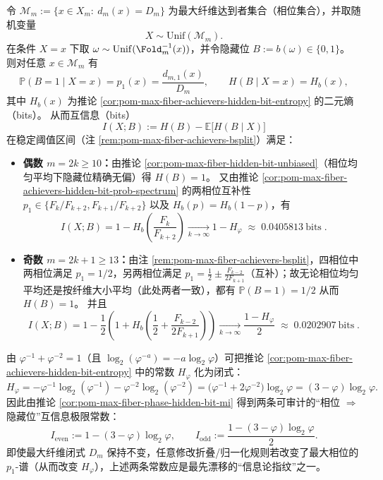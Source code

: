 \begin{corollary}\label{cor:pom-max-fiber-phase-hidden-bit-mi}
令 \(\mathcal{M}_m:=\{x\in X_m:\ d_m(x)=D_m\}\) 为最大纤维达到者集合（相位集合），并取随机变量
\[
X\sim\mathrm{Unif}(\mathcal{M}_m).
\]
在条件 \(X=x\) 下取
\(
\omega\sim\mathrm{Unif}(\Fold_m^{-1}(x))
\)，并令隐藏位 \(B:=b(\omega)\in\{0,1\}\)。
则对任意 \(x\in\mathcal{M}_m\) 有
\[
\mathbb{P}(B=1\mid X=x)=p_1(x)=\frac{d_{m,1}(x)}{D_m},
\qquad
H(B\mid X=x)=H_b(x),
\]
其中 \(H_b(x)\) 为推论 \ref{cor:pom-max-fiber-achievers-hidden-bit-entropy} 的二元熵（bits）。
从而互信息（bits）
\[
I(X;B):=H(B)-\mathbb{E}\!\bigl[H(B\mid X)\bigr]
\]
在稳定阈值区间（注 \ref{rem:pom-max-fiber-achievers-bsplit}）满足：
\begin{itemize}
  \item \textbf{偶数 \(m=2k\ge 10\)：}由推论 \ref{cor:pom-max-fiber-hidden-bit-unbiased}（相位均匀平均下隐藏位精确无偏）得 \(H(B)=1\)。
  又由推论 \ref{cor:pom-max-fiber-achievers-hidden-bit-prob-spectrum} 的两相位互补性 \(p_1\in\{F_k/F_{k+2},F_{k+1}/F_{k+2}\}\) 以及 \(H_b(p)=H_b(1-p)\)，有
  \[
  \boxed{\;
  I(X;B)=1-H_b\!\left(\frac{F_k}{F_{k+2}}\right)
  \xrightarrow[k\to\infty]{}
  1-H_\varphi\;\approx\;0.0405813\ \mathrm{bits}\; }.
  \]
  \item \textbf{奇数 \(m=2k+1\ge 13\)：}由注 \ref{rem:pom-max-fiber-achievers-bsplit}，四相位中两相位满足 \(p_1=1/2\)，另两相位满足 \(p_1=\tfrac12\pm \tfrac{F_{k-2}}{2F_{k+1}}\)（互补）；故无论相位均匀平均还是按纤维大小平均（此处两者一致），都有 \(\mathbb{P}(B=1)=1/2\) 从而 \(H(B)=1\)。
  并且
  \[
  \boxed{\;
  I(X;B)=1-\frac{1}{2}\left(1+H_b\!\left(\frac12+\frac{F_{k-2}}{2F_{k+1}}\right)\right)
  \xrightarrow[k\to\infty]{}
  \frac{1-H_\varphi}{2}\;\approx\;0.0202907\ \mathrm{bits}\; }.
  \]
\end{itemize}
\end{corollary}

\begin{remark}[相位 \texorpdfstring{$\Rightarrow$}{=>} 隐藏位的泄露常数闭式：奇偶两条互信息极限（226）]\label{rem:pom-max-fiber-hidden-bit-leakage-constants}
由 \(\varphi^{-1}+\varphi^{-2}=1\)（且 \(\log_2(\varphi^{-a})=-a\log_2\varphi\)）可把推论 \ref{cor:pom-max-fiber-achievers-hidden-bit-entropy} 中的常数 \(H_\varphi\) 化为闭式：
\[
H_\varphi
=-\varphi^{-1}\log_2(\varphi^{-1})-\varphi^{-2}\log_2(\varphi^{-2})
=\bigl(\varphi^{-1}+2\varphi^{-2}\bigr)\log_2\varphi
=(3-\varphi)\log_2\varphi.
\]
因此由推论 \ref{cor:pom-max-fiber-phase-hidden-bit-mi} 得到两条可审计的“相位 \(\Rightarrow\) 隐藏位”互信息极限常数：
\[
I_{\mathrm{even}}
:=1-(3-\varphi)\log_2\varphi,
\qquad
I_{\mathrm{odd}}
:=\frac{1-(3-\varphi)\log_2\varphi}{2}.
\]
即使最大纤维闭式 \(D_m\) 保持不变，任意修改折叠/归一化规则若改变了最大相位的 \(p_1\)-谱（从而改变 \(H_\varphi\)），上述两条常数应是最先漂移的“信息论指纹”之一。
\end{remark}

